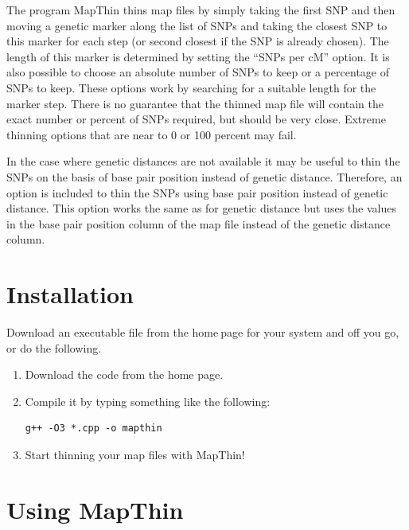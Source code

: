 \documentclass[a4paper,12pt]{article}
\begin{document}
The program MapThin thins map files by simply taking the first SNP and then moving a genetic marker along the list of SNPs and taking the closest SNP to this marker for each step (or second closest if the SNP is already chosen). The length of this marker is determined by setting the ``SNPs per cM'' option. It is also possible to choose an absolute number of SNPs to keep or a percentage of SNPs to keep. These options work by searching for a suitable length for the marker step. There is no guarantee that the thinned map file will contain the exact number or percent of SNPs required, but should be very close. Extreme thinning options that are near to 0 or 100 percent may fail. 

In the case where genetic distances are not available it may be useful to thin the SNPs on the basis of base pair position instead of genetic distance. Therefore, an option is included to thin the SNPs using base pair position instead of genetic distance. This option works the same as for genetic distance but uses the values in the base pair position column of the map file instead of the genetic distance column. 


\section{Installation}
\label{installation}

Download an executable file from the home$\:$page for your system and off you go, or do the following. 
\begin{enumerate}

\item Download the code from the home page. 
\item Compile it by typing something like the following: \vspace{0.35cm} \begin{lstlisting}
g++ -O3 *.cpp -o mapthin 
\end{lstlisting} \vspace{0.35cm}
\item Start thinning your map files with MapThin!\end{enumerate}


\section{Using MapThin}
\label{using}
\end{document}
